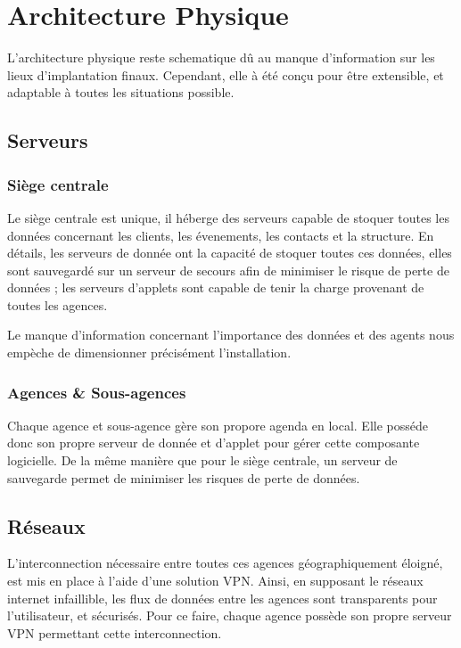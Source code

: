 \section{Architecture Physique}

    L'architecture physique reste schematique dû au manque d'information sur les lieux d'implantation finaux.
    Cependant, elle à été conçu pour être extensible, et adaptable à toutes les situations possible.

    \subsection{Serveurs}
        
        \subsubsection{Siège centrale}
        
            Le siège centrale est unique, il héberge des serveurs capable de stoquer toutes les données concernant les clients, les évenements, les contacts et la structure.
            En détails, les serveurs de donnée ont la capacité de stoquer toutes ces données, elles sont sauvegardé sur un serveur de secours afin de minimiser le risque de perte de données ; les serveurs d'applets sont capable de tenir la charge provenant de toutes les agences.
            
            Le manque d'information concernant l'importance des données et des agents nous empèche de dimensionner précisément l'installation.
        
        \subsubsection{Agences & Sous-agences}
        
            Chaque agence et sous-agence gère son propore agenda en local. Elle posséde donc son propre serveur de donnée et d'applet pour gérer cette composante logicielle. De la même manière que pour le siège centrale, un serveur de sauvegarde permet de minimiser les risques de perte de données.            
    
    \subsection{Réseaux}
    
        L'interconnection nécessaire entre toutes ces agences géographiquement éloigné, est mis en place à l'aide d'une solution VPN.
        Ainsi, en supposant le réseaux internet infaillible, les flux de données entre les agences sont transparents pour l'utilisateur, et sécurisés.
        Pour ce faire, chaque agence possède son propre serveur VPN permettant cette interconnection.

